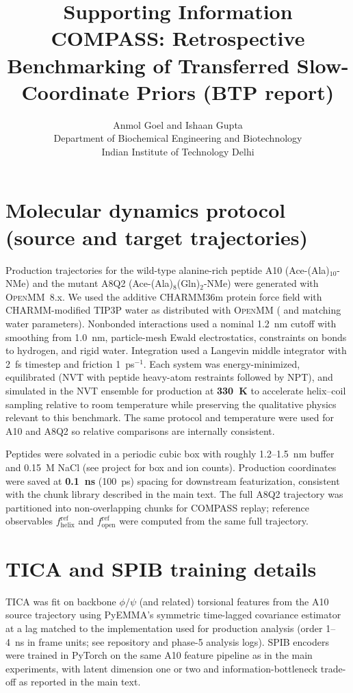 \documentclass[11pt]{article}
\title{Supporting Information\\[0.5em]\large COMPASS: Retrospective Benchmarking of Transferred Slow-Coordinate Priors (BTP report)}
\author{Anmol Goel and Ishaan Gupta\\Department of Biochemical Engineering and Biotechnology\\Indian Institute of Technology Delhi}
\date{}
\begin{document}
\maketitle

\tableofcontents
\newpage

\section{Molecular dynamics protocol (source and target trajectories)}

Production trajectories for the wild-type alanine-rich peptide A10 (Ace-(Ala)$_{10}$-NMe) and the mutant A8Q2 (Ace-(Ala)$_8$(Gln)$_2$-NMe) were generated with \textsc{OpenMM}~8.x.\cite{eastman2017openmm}
We used the additive CHARMM36m protein force field with CHARMM-modified TIP3P water as distributed with \textsc{OpenMM} ( and matching water parameters).\cite{huang2017charmm36m,kim2015charmmgui}
Nonbonded interactions used a nominal 1.2~nm cutoff with smoothing from 1.0~nm, particle-mesh Ewald electrostatics, constraints on bonds to hydrogen, and rigid water.
Integration used a Langevin middle integrator with 2~fs timestep and friction 1~ps$^{-1}$.
Each system was energy-minimized, equilibrated (NVT with peptide heavy-atom restraints followed by NPT), and simulated in the NVT ensemble for production at \textbf{330~K} to accelerate helix--coil sampling relative to room temperature while preserving the qualitative physics relevant to this benchmark.
The same protocol and temperature were used for A10 and A8Q2 so relative comparisons are internally consistent.

Peptides were solvated in a periodic cubic box with roughly 1.2--1.5~nm buffer and 0.15~M NaCl (see project  for box and ion counts).
Production coordinates were saved at \textbf{0.1~ns} (100~ps) spacing for downstream featurization, consistent with the chunk library described in the main text.
The full A8Q2 trajectory was partitioned into non-overlapping chunks for COMPASS replay; reference observables $f_{\mathrm{helix}}^{\mathrm{ref}}$ and $f_{\mathrm{open}}^{\mathrm{ref}}$ were computed from the same full trajectory.

\section{TICA and SPIB training details}

TICA was fit on backbone $\phi/\psi$ (and related) torsional features from the A10 source trajectory using PyEMMA's symmetric time-lagged covariance estimator at a lag matched to the implementation used for production analysis (order 1--4~ns in frame units; see repository  and phase-5 analysis logs).
SPIB encoders were trained in PyTorch on the same A10 feature pipeline as in the main experiments, with latent dimension one or two and information-bottleneck trade-off as reported in the main text.
\end{document}
